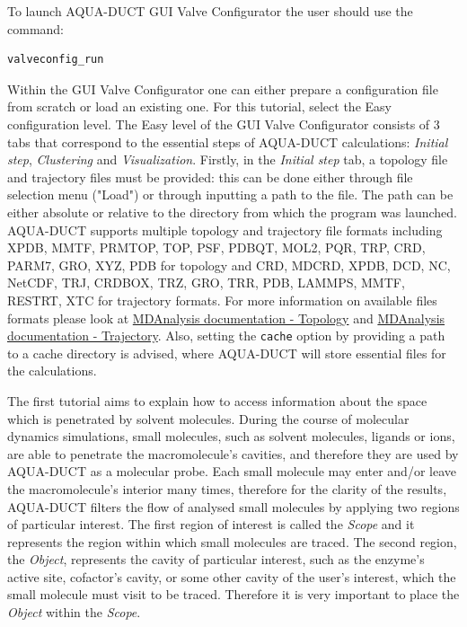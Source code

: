 \documentclass[9pt,tutorial]{livecoms}
\begin{document}
To launch AQUA-DUCT GUI Valve Configurator the user should use the command:
\begin{lstlisting}
valveconfig_run
\end{lstlisting}
Within the GUI Valve Configurator one can either prepare a configuration file from scratch or load an existing one. 
For this tutorial, select the Easy configuration level. The Easy level of the GUI Valve Configurator consists of 3 tabs that correspond to the essential steps of AQUA-DUCT calculations: \textit{Initial step}, \textit{Clustering} and \textit{Visualization}.
Firstly, in the \textit{Initial step} tab, a topology file and trajectory files must be provided: this can be done either through file selection menu ("Load") or through inputting a path to the file. The path can be either absolute or relative to the directory from which the program was launched. AQUA-DUCT supports multiple topology and trajectory file formats including XPDB, MMTF, PRMTOP, TOP, PSF, PDBQT, MOL2, PQR, TRP, CRD, PARM7, GRO, XYZ, PDB for topology and CRD, MDCRD, XPDB, DCD, NC, NetCDF, TRJ, CRDBOX, TRZ, GRO, TRR, PDB, LAMMPS, MMTF, RESTRT, XTC for trajectory formats. For more information on available files formats please look at \href{https://www.mdanalysis.org/docs/documentation_pages/topology/init.html}{MDAnalysis documentation - Topology} and \href{https://www.mdanalysis.org/docs/documentation_pages/coordinates/init.html}{MDAnalysis documentation - Trajectory}. Also, setting the \texttt{cache} option by providing a path to a cache directory is advised, where AQUA-DUCT will store essential files for the calculations.

The first tutorial aims to explain how to access information about the space which is penetrated by solvent molecules. During the course of molecular dynamics simulations, small molecules, such as solvent molecules, ligands or ions, are able to penetrate the macromolecule's cavities, and therefore they are used by AQUA-DUCT as a molecular probe. Each small molecule may enter and/or leave the macromolecule's interior many times, therefore for the clarity of the results, AQUA-DUCT filters the flow of analysed small molecules by applying two regions of particular interest. The first region of interest is called the \emph{Scope} and it represents the region within which small molecules are traced. The second region, the \emph{Object}, represents the cavity of particular interest, such as the enzyme's active site, cofactor's cavity, or some other cavity of the user's interest, which the small molecule must visit to be traced. Therefore it is very important to place the \emph{Object} within the \emph{Scope}. 
\end{document}
